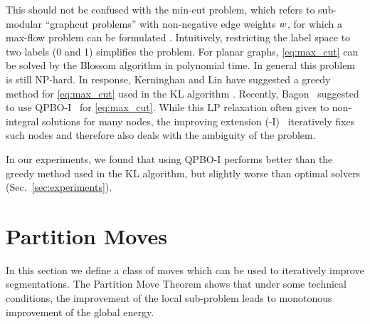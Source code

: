 This should not be confused with the min-cut problem, which refers to
sub-modular ``graphcut problems'' with non-negative edge weights
$w$, for which a max-flow problem can be formulated
\cite{kolmogorov_2004_pami}.
%
Intuitively, restricting the label space to two labels (0 and 1) simplifies the
problem.
%
For planar graphs, \eqref{eq:max_cut} can be solved by the
Blossom algorithm \cite{schraudolph_2009_nips} in polynomial time.
In general this problem is still NP-hard.
%
In response, Kerninghan and Lin have suggested a greedy method
for \eqref{eq:max_cut} used in the
KL algorithm \cite{kerninghan_1970_bell}. Recently,
Bagon~\cite{bagon_2011_arxiv} suggested to use
\mbox{QPBO-I}~\cite{rother_2007_cvpr} for \eqref{eq:max_cut}.
While this LP relaxation 
often gives to non-integral solutions for many nodes, the improving
extension (-I)~\cite{rother_2007_cvpr} iteratively fixes such nodes and
therefore also deals with the ambiguity of the problem.

In our experiments, we found that using \mbox{QPBO-I} performs 
better than the greedy method used in the KL algorithm,
but slightly worse than optimal solvers (Sec.~\ref{sec:experiments}).





\section{Partition Moves\label{sec:cut_moves}}
\noindent
In this section we define a class of moves which can be used to iteratively
improve segmentations. The Partition Move Theorem shows that under some
technical conditions, the improvement of the local sub-problem 
leads to monotonous improvement of the global energy.

